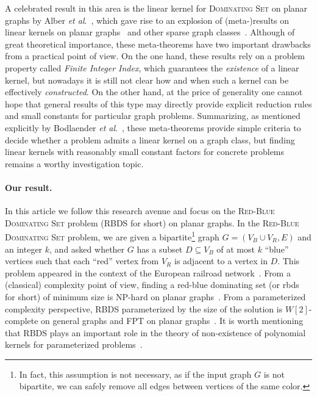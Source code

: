 \documentclass[a4paper,11pt]{article}
\newcommand{\drb}    [0] {rbds\xspace}
\newcommand{\RBDS}{\textsc{RBDS}\xspace}
\newcommand{\NP}{\ensuremath{\text{NP}}\xspace}
\begin{document}
A celebrated result in this area is the linear kernel for \textsc{Dominating Set} on planar graphs by Alber \emph{et al}.~\cite{AFN04}, which gave rise to an explosion of (meta-)results on linear kernels on planar graphs~\cite{GuNi07} and other sparse graph classes~\cite{BFL+09,FLST10,KLP+12}.
Although of great theoretical importance, these meta-theorems have two important drawbacks from a practical point of view. On the one hand, these results rely on a problem property called \emph{Finite Integer Index}, which guarantees the {\sl existence} of a linear kernel, but nowadays it is still not clear how and when such a kernel can be effectively {\sl constructed}. On the other hand, at the price of generality one cannot hope that general results of this type may directly provide explicit reduction rules and small constants for particular graph problems. Summarizing, as mentioned explicitly by Bodlaender \emph{et al}.~\cite{BFL+09}, these meta-theorems provide simple criteria to decide whether a problem admits a linear kernel on a graph class, but finding linear kernels with reasonably small constant factors for concrete problems remains a worthy investigation topic.


\paragraph{Our result.} In this article we follow this research avenue and focus on the \textsc{Red-Blue Dominating Set} problem (\RBDS for short) on planar graphs. In the \textsc{Red-Blue Dominating Set} problem, we are given a bipartite\footnote{In fact, this assumption is not necessary, as if the input graph $G$ is not bipartite, we can safely remove all edges between vertices of the same color.} graph $G = (V_B \cup V_R,E)$ and an integer $k$, and asked whether $G$ has a subset $D \subseteq V_B$ of at most $k$ ``blue'' vertices such that each ``red'' vertex from $V_R$ is adjacent to a vertex in $D$. This problem appeared in the context of the European railroad network~\cite{Wei98}.
From a (classical) complexity point of view, finding a red-blue dominating set (or \drb for short) of minimum size is \NP-hard on planar graphs~\cite{ABFN00}. From a parameterized complexity perspective, \RBDS parameterized by the size of the solution is $W[2]$-complete on general graphs and {\sf FPT} on planar graphs~\cite{DF99}. It is worth mentioning that \RBDS plays an important role in the theory of non-existence of polynomial kernels for parameterized problems~\cite{DLS09}.
\end{document}
